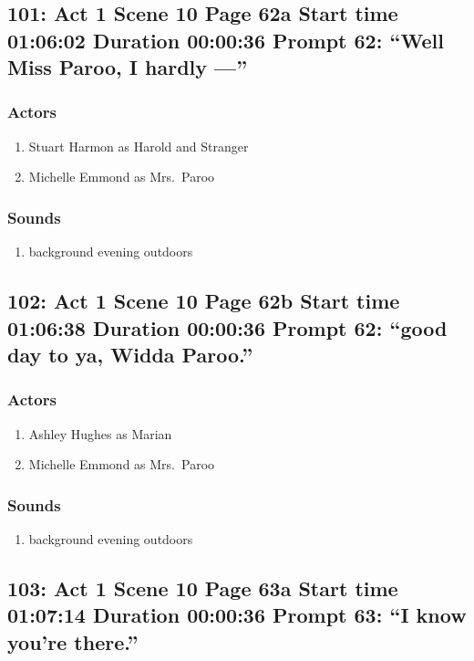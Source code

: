 \subsection{101: Act 1 Scene 10 Page 62a Start time 01:06:02 Duration 00:00:36 Prompt 62: ``Well Miss Paroo, I hardly ---''}

\subsubsection{Actors}
\begin{enumerate}
\item Stuart Harmon as Harold and Stranger
\item Michelle Emmond as Mrs.~Paroo
\end{enumerate}

\subsubsection{Sounds}
\begin{enumerate}
\item background evening outdoors
\end{enumerate}
\subsection{102: Act 1 Scene 10 Page 62b Start time 01:06:38 Duration 00:00:36 Prompt 62: ``good day to ya, Widda Paroo.''}

\subsubsection{Actors}
\begin{enumerate}
\item Ashley Hughes as Marian
\item Michelle Emmond as Mrs.~Paroo
\end{enumerate}

\subsubsection{Sounds}
\begin{enumerate}
\item background evening outdoors
\end{enumerate}
\subsection{103: Act 1 Scene 10 Page 63a Start time 01:07:14 Duration 00:00:36 Prompt 63: ``I know you're there.''}

